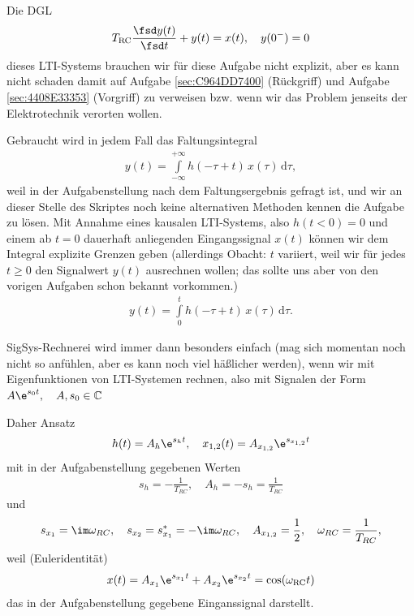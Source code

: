 \begin{Werkzeug}
Die DGL
\begin{equation}
T_\mathrm{RC} \frac{\fsd y(t)}{\fsd t} + y(t) = x(t),\quad y(0^-)=0
\end{equation}
dieses LTI-Systems brauchen wir für diese Aufgabe nicht explizit, aber es kann nicht
schaden damit auf Aufgabe \ref{sec:C964DD7400} (Rückgriff)
und Aufgabe \ref{sec:4408E33353} (Vorgriff) zu verweisen bzw. wenn wir das Problem
jenseits der Elektrotechnik verorten wollen.

Gebraucht wird in jedem Fall das Faltungsintegral
\begin{align}
y(t) = \int\limits_{-\infty}^{+\infty} h(-\tau+t) \, x(\tau) \, \mathrm{d}\tau,
\end{align}
weil in der Aufgabenstellung nach dem Faltungsergebnis gefragt ist, und wir an
dieser Stelle des Skriptes noch keine alternativen Methoden kennen die Aufgabe
zu lösen.
%
Mit Annahme eines kausalen LTI-Systems, also $h(t<0) = 0$ und einem ab $t=0$ dauerhaft
anliegenden Eingangssignal $x(t)$ können wir dem Integral explizite Grenzen geben
(allerdings Obacht: $t$ variiert, weil wir für jedes $t\geq 0$ den Signalwert $y(t)$
ausrechnen wollen; das sollte uns aber von den vorigen Aufgaben schon bekannt vorkommen.)
%
\begin{align}
y(t) = \int\limits_{0}^{t} h(-\tau+t) \, x(\tau) \, \mathrm{d}\tau.
\end{align}
\end{Werkzeug}
\begin{Ansatz}
SigSys-Rechnerei wird immer dann besonders einfach (mag sich momentan noch nicht so anfühlen,
aber es kann noch viel häßlicher werden), wenn wir mit Eigenfunktionen von LTI-Systemen
rechnen, also mit Signalen der Form $A \e^{s_0 t},\quad A, s_0 \in \mathbb{C}$

\noindent Daher Ansatz
\begin{align}
h(t) = A_h \e^{s_h t}, \quad x_{1,2}(t) = A_{x_{1,2}} \e^{s_{x_{1,2}} t}
\end{align}
mit in der Aufgabenstellung gegebenen Werten
\begin{align}
s_h = -\frac{1}{T_{RC}},\quad A_h = -s_h = \frac{1}{T_{RC}}
\end{align}
und
\begin{align}
s_{x_1} = \im\omega_{RC},\quad s_{x_2} = s^*_{x_1} = -\im\omega_{RC}, \quad A_{x_{1,2}}=\frac{1}{2},\quad \omega_{RC} = \frac{1}{T_{RC}},
\end{align}
weil (Euleridentität)
\begin{align}
x(t) = A_{x_{1}} \e^{s_{x_{1}} t} + A_{x_{2}} \e^{s_{x_{2}} t} = \cos(\omega_\mathrm{RC} t)
\end{align}
das in der Aufgabenstellung gegebene Einganssignal darstellt.
\end{Ansatz}
